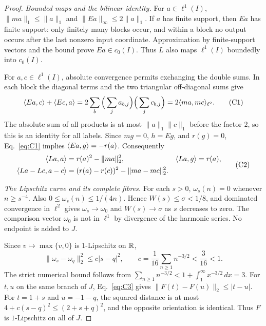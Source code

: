 \begin{proof}
\noindent\textit{Bounded maps and the bilinear identity.}
\label{sec:C1}
For $a\in\ell^1(I)$, $\|ma\|_1\le\|a\|_1$ and
$\|Ea\|_\infty\le2\|a\|_1$. If $a$ has finite support, then $Ea$ has
finite support: only finitely many blocks occur, and within a block no
output occurs after the last nonzero input coordinate. Approximation by
finite-support vectors and the bound prove $Ea\in c_0(I)$.
Thus $L$ also maps $\ell^1(I)$ boundedly into $c_0(I)$.

For $a,c\in\ell^1(I)$, absolute convergence permits exchanging the double
sums. In each block the diagonal terms and the two triangular
off-diagonal sums give
\begin{equation}
\langle Ea,c\rangle+\langle Ec,a\rangle
 =2\sum_b\Big(\sum_j a_{b,j}\Big)\Big(\sum_j c_{b,j}\Big)
 =2\langle ma,mc\rangle_{\ell^2}.
\tag{C1}\label{eq:C1}
\end{equation}
The absolute sum of all products is at most $\|a\|_1\|c\|_1$ before the
factor $2$, so this is an identity for all labels. Since $mg=0$, $h=Eg$,
and $r(g)=0$, Eq.~\eqref{eq:C1} implies $\langle Ea,g\rangle=-r(a)$.
Consequently
\begin{equation}
\begin{aligned}
\langle La,a\rangle&=r(a)^2-\|ma\|_2^2,&
\langle La,g\rangle&=r(a),\\
\langle La-Lc,a-c\rangle&=(r(a)-r(c))^2-\|ma-mc\|_2^2.
\end{aligned}
\tag{C2}\label{eq:C2}
\end{equation}

\noindent\textit{The Lipschitz curve and its complete fibres.}
\label{sec:C2}
For each $s>0$, $\omega_s(n)=0$ whenever $n\ge s^{-4}$. Also
$0\le\omega_s(n)\le1/(4n)$. Hence $W(s)\le\sigma<1/8$, and dominated
convergence in $\ell^2$ gives $\omega_s\to\omega_0$ and $W(s)\to\sigma$
as $s$ decreases to zero. The comparison vector $\omega_0$ is not in
$\ell^1$ by divergence of the harmonic series. No endpoint is added to $J$.

Since $v\mapsto\max\{v,0\}$ is $1$-Lipschitz on $\mathbb R$,
\begin{equation}
\|\omega_s-\omega_q\|_2^2\le c|s-q|^2,\qquad
c=\frac1{16}\sum_{n\ge1}n^{-3/2}<\frac3{16}<1.
\tag{C3}\label{eq:C3}
\end{equation}
The strict numerical bound follows from
$\sum_{n\ge1}n^{-3/2}<1+\int_1^\infty x^{-3/2}\,dx=3$.
For $t,u$ on the same branch of $J$, Eq.~\eqref{eq:C3} gives
$\|F(t)-F(u)\|_2\le|t-u|$. For $t=1+s$ and $u=-1-q$, the squared
distance is at most $4+c(s-q)^2\le(2+s+q)^2$, and the opposite
orientation is identical. Thus $F$ is $1$-Lipschitz on all of $J$.


\end{proof}
